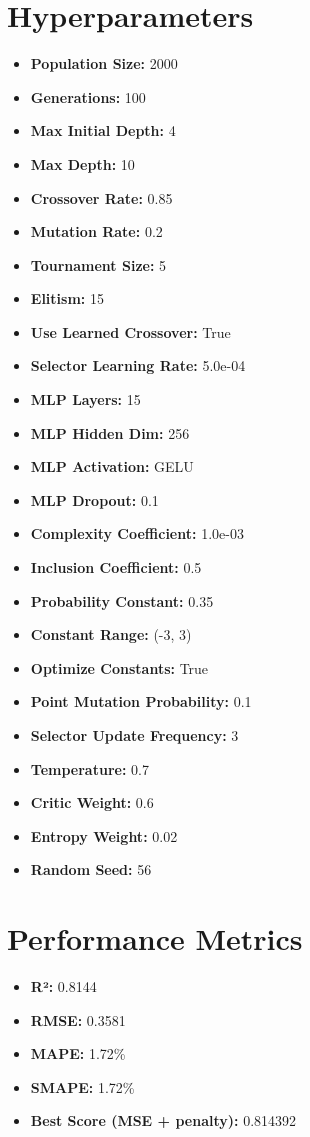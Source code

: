 \documentclass{article}
\begin{document}
\section*{Hyperparameters}
\begin{itemize}
\item \textbf{Population Size:} 2000
\item \textbf{Generations:} 100
\item \textbf{Max Initial Depth:} 4
\item \textbf{Max Depth:} 10
\item \textbf{Crossover Rate:} 0.85
\item \textbf{Mutation Rate:} 0.2
\item \textbf{Tournament Size:} 5
\item \textbf{Elitism:} 15
\item \textbf{Use Learned Crossover:} True
\item \textbf{Selector Learning Rate:} 5.0e-04
\item \textbf{MLP Layers:} 15
\item \textbf{MLP Hidden Dim:} 256
\item \textbf{MLP Activation:} GELU
\item \textbf{MLP Dropout:} 0.1
\item \textbf{Complexity Coefficient:} 1.0e-03
\item \textbf{Inclusion Coefficient:} 0.5
\item \textbf{Probability Constant:} 0.35
\item \textbf{Constant Range:} (-3, 3)
\item \textbf{Optimize Constants:} True
\item \textbf{Point Mutation Probability:} 0.1
\item \textbf{Selector Update Frequency:} 3
\item \textbf{Temperature:} 0.7
\item \textbf{Critic Weight:} 0.6
\item \textbf{Entropy Weight:} 0.02
\item \textbf{Random Seed:} 56
\end{itemize}
\section*{Performance Metrics}
\begin{itemize}
\item \textbf{R²:} 0.8144
\item \textbf{RMSE:} 0.3581
\item \textbf{MAPE:} 1.72\%
\item \textbf{SMAPE:} 1.72\%
\item \textbf{Best Score (MSE + penalty):} 0.814392
\end{itemize}
\end{document}
